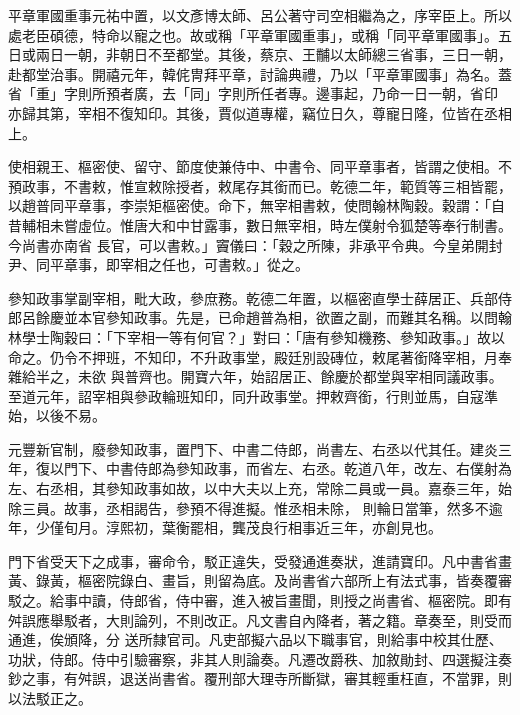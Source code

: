\begin{pinyinscope}
 平章軍國重事元祐中置，以文彥博太師、呂公著守司空相繼為之，序宰臣上。所以處老臣碩德，特命以寵之也。故或稱「平章軍國重事」，或稱「同平章軍國事」。五日或兩日一朝，非朝日不至都堂。其後，蔡京、王黼以太師總三省事，三日一朝，赴都堂治事。開禧元年，韓侂冑拜平章，討論典禮，乃以「平章軍國事」為名。蓋省「重」字則所預者廣，去「同」字則所任者專。邊事起，乃命一日一朝，省印
 亦歸其第，宰相不復知印。其後，賈似道專權，竊位日久，尊寵日隆，位皆在丞相上。



 使相親王、樞密使、留守、節度使兼侍中、中書令、同平章事者，皆謂之使相。不預政事，不書敕，惟宣敕除授者，敕尾存其銜而已。乾德二年，範質等三相皆罷，以趙普同平章事，李崇矩樞密使。命下，無宰相書敕，使問翰林陶穀。穀謂：「自昔輔相未嘗虛位。惟唐大和中甘露事，數日無宰相，時左僕射令狐楚等奉行制書。今尚書亦南省
 長官，可以書敕。」竇儀曰：「穀之所陳，非承平令典。今皇弟開封尹、同平章事，即宰相之任也，可書敕。」從之。



 參知政事掌副宰相，毗大政，參庶務。乾德二年置，以樞密直學士薛居正、兵部侍郎呂餘慶並本官參知政事。先是，已命趙普為相，欲置之副，而難其名稱。以問翰林學士陶穀曰：「下宰相一等有何官？」對曰：「唐有參知機務、參知政事。」故以命之。仍令不押班，不知印，不升政事堂，殿廷別設磚位，敕尾著銜降宰相，月奉雜給半之，未欲
 與普齊也。開寶六年，始詔居正、餘慶於都堂與宰相同議政事。至道元年，詔宰相與參政輪班知印，同升政事堂。押敕齊銜，行則並馬，自寇準始，以後不易。



 元豐新官制，廢參知政事，置門下、中書二侍郎，尚書左、右丞以代其任。建炎三年，復以門下、中書侍郎為參知政事，而省左、右丞。乾道八年，改左、右僕射為左、右丞相，其參知政事如故，以中大夫以上充，常除二員或一員。嘉泰三年，始除三員。故事，丞相謁告，參預不得進擬。惟丞相未除，
 則輪日當筆，然多不逾年，少僅旬月。淳熙初，葉衡罷相，龔茂良行相事近三年，亦創見也。



 門下省受天下之成事，審命令，駁正違失，受發通進奏狀，進請寶印。凡中書省畫黃、錄黃，樞密院錄白、畫旨，則留為底。及尚書省六部所上有法式事，皆奏覆審駁之。給事中讀，侍郎省，侍中審，進入被旨畫聞，則授之尚書省、樞密院。即有舛誤應舉駁者，大則論列，不則改正。凡文書自內降者，著之籍。章奏至，則受而通進，俟頒降，分
 送所隸官司。凡吏部擬六品以下職事官，則給事中校其仕歷、功狀，侍郎。侍中引驗審察，非其人則論奏。凡遷改爵秩、加敘勛封、四選擬注奏鈔之事，有舛誤，退送尚書省。覆刑部大理寺所斷獄，審其輕重枉直，不當罪，則以法駁正之。




\end{pinyinscope}
